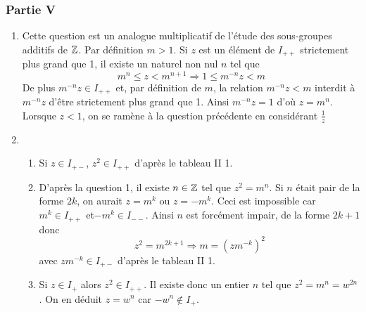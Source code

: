 \subsubsection*{Partie V}
\begin{enumerate}
\item Cette question est un analogue multiplicatif de l'étude des sous-groupes additifs de $\mathbb{Z}$.\newline
Par définition $m>1$. Si $z$ est un élément de $I_{++}$ strictement plus grand que 1, il existe un naturel non nul $n$ tel que 
$$m^{n} \leq z < m^{n+1} \Rightarrow 1\leq m^{-n}z<m$$
De plus $ m^{-n}z \in I_{++}$ et, par définition de $m$, la relation $ m^{-n}z<m $ interdit à $ m^{-n}z $ d'être strictement plus grand que 1. Ainsi $m^{-n}z =1$ d'où $z=m^{n}$.\newline
Lorsque $z<1$, on se ramène à la question précédente en considérant $\frac{1}{z}$
\item \begin{enumerate} \item
Si $z \in I_{+-}$, $z^2 \in I_{++}$ d'après le tableau II 1.
\item D'après la question 1, il existe $n\in \mathbb{Z}$ tel que $z^2=m^n$.\newline
Si $n$ était pair de la forme $2k$, on aurait $z=m^k$ ou $z=-m^k$. Ceci est impossible car $m^k\in I_{++}$ et$-m^k\in I_{--}$. Ainsi $n$ est forcément impair, de la forme $2k+1$ donc
\begin{displaymath}
z^2=m^{2k+1} \Rightarrow m=(zm^{-k})^2
\end{displaymath}
avec $ zm^{-k}\in I_{+-}$ d'après le tableau II 1.
\item Si $z\in I_{+}$ alors $z^2\in I_{++}$. Il existe donc un entier $n$ tel que $z^2=m^n=w^{2n}$. On en déduit $z=w^n$ car $-w^n \not\in I_{+}$.
\end{enumerate}
\end{enumerate}
